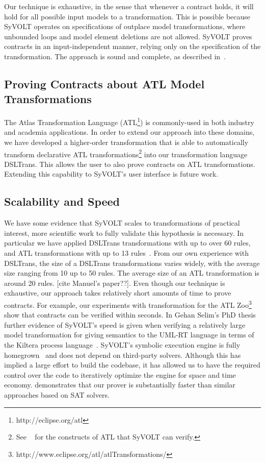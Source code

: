 Our technique is exhaustive, in the sense that whenever a contract holds, it
will hold for all possible input models to a transformation. This is possible
because SyVOLT operates on specifications of outplace model transformations,
where unbounded loops and model element deletions are not allowed. SyVOLT proves
contracts in an input-independent manner, relying only on the specification of the
transformation. The approach is sound and complete, as described
in~\cite{Lucio2014}.

\subsection{Proving Contracts about ATL Model Transformations}
The Atlas Transformation Language (ATL\footnote{http://eclipse.org/atl}) is
commonly-used in both industry and academia applications. In order to extend our approach into these domains, we
have developed a higher-order transformation that is able to automatically
transform declarative ATL transformations\footnote{See ~\cite{Oakes} for the
constructs of ATL that SyVOLT can verify.} into our transformation language
DSLTrans. This allows the user to also prove contracts on ATL transformations. Extending this capability to SyVOLT's user interface is
future work.

\subsection{Scalability and Speed}

We have some evidence that SyVOLT scales to transformations of practical
interest, more scientific work to fully validate this hypothesis is
necessary. In particular we have applied DSLTrans transformations with up to
over 60 rules, and ATL transformations with up to 13 rules~\cite{Oakes}. From our own
experience with DSLTrans, the size of a DSLTrans transformations varies widely,
with the average size ranging from 10 up to 50 rules. The average size of an ATL
transformation is around 20 rules. [cite Manuel's paper??].
Even though our technique is exhaustive, our approach takes relatively short
amounts of time to prove contracts. For example, our experiments with
transformation for the ATL
Zoo\footnote{http://www.eclipse.org/atl/atlTransformations/}~\cite{Oakes} show that contracts can be verified within seconds. In Gehan Selim's PhD thesis~\cite{Selim2015}
further evidence of SyVOLT's speed is given when verifying a relatively large model transformation
for giving semantics to the UML-RT language in terms of the Kiltera process
language~\cite{PosseDingel2014}. SyVOLT's symbolic execution engine is fully
homegrown~\cite{LucioVang} and does not depend on third-party solvers. Although
this has implied a large effort to build the codebase, it has allowed us to
have the required control over the code to iteratively optimize the engine for
space and time economy.
\cite{Selim2014} demonstrates that our prover is substantially faster than
similar approaches based on SAT solvers.


